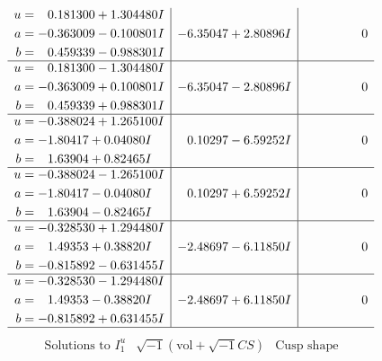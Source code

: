 \documentclass[1p]{elsarticle_modified}
\theoremstyle{definition}
\newcommand{\I}{\sqrt{-1}}
\begin{document}
$$\begin{array}{c|c|c}
\begin{aligned}
u &= \phantom{-}0.181300 + 1.304480 I \\
a &= -0.363009 - 0.100801 I \\
b &= \phantom{-}0.459339 - 0.988301 I\end{aligned}
 & -6.35047 + 2.80896 I & \phantom{-0.000000 } 0 \\ \hline\begin{aligned}
u &= \phantom{-}0.181300 - 1.304480 I \\
a &= -0.363009 + 0.100801 I \\
b &= \phantom{-}0.459339 + 0.988301 I\end{aligned}
 & -6.35047 - 2.80896 I & \phantom{-0.000000 } 0 \\ \hline\begin{aligned}
u &= -0.388024 + 1.265100 I \\
a &= -1.80417 + 0.04080 I \\
b &= \phantom{-}1.63904 + 0.82465 I\end{aligned}
 & \phantom{-}0.10297 - 6.59252 I & \phantom{-0.000000 } 0 \\ \hline\begin{aligned}
u &= -0.388024 - 1.265100 I \\
a &= -1.80417 - 0.04080 I \\
b &= \phantom{-}1.63904 - 0.82465 I\end{aligned}
 & \phantom{-}0.10297 + 6.59252 I & \phantom{-0.000000 } 0 \\ \hline\begin{aligned}
u &= -0.328530 + 1.294480 I \\
a &= \phantom{-}1.49353 + 0.38820 I \\
b &= -0.815892 - 0.631455 I\end{aligned}
 & -2.48697 - 6.11850 I & \phantom{-0.000000 } 0 \\ \hline\begin{aligned}
u &= -0.328530 - 1.294480 I \\
a &= \phantom{-}1.49353 - 0.38820 I \\
b &= -0.815892 + 0.631455 I\end{aligned}
 & -2.48697 + 6.11850 I & \phantom{-0.000000 } 0\\
 \hline 
 \end{array}$$\newpage$$\begin{array}{c|c|c}  
\text{Solutions to }I^u_{1}& \I (\text{vol} + \sqrt{-1}CS) & \text{Cusp shape}\\
 \hline 
\begin{aligned}

\end{aligned}
\end{array}$$
\end{document}
